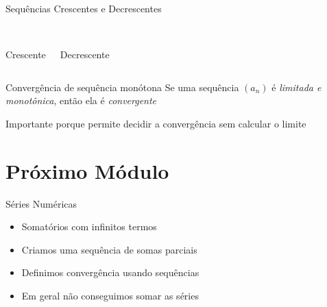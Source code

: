 \begin{frame}{Sequências Crescentes e Decrescentes}
  \begin{columns}
    \begin{center}
      \scalebox{0.9}{} \\[5mm]
      Crescente
    \end{center}
    \begin{center}
      \scalebox{0.9}{} \\[5mm]
      Decrescente
    \end{center}
  \end{columns}
\end{frame}

\begin{frame}{Convergência de sequência monótona}
	Se uma sequência $(a_n)$ é \emph{limitada e monotônica}, então ela é \emph{convergente}

	\pause
	\vspace{2\baselineskip}
	Importante porque permite decidir a convergência sem calcular o limite
\end{frame}

\section{Próximo Módulo}

\begin{frame}{Séries Numéricas}
\begin{itemize}[<+->]
	\item Somatórios com infinitos termos
	\item Criamos uma sequência de somas parciais
	\item Definimos convergência usando sequências
	\item Em geral não conseguimos somar as séries
\end{itemize}
\end{frame}

\begin{frame}{\mytitle}{\mysubtitle}
  \tableofcontents
\end{frame}


